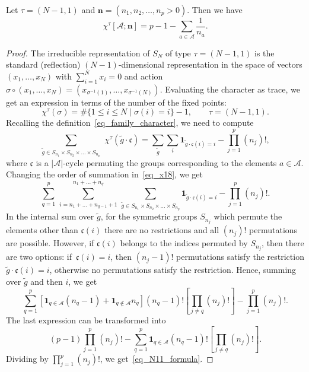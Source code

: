 \begin{theorem}
 \label{Theorem_character_sum_fundamental} Let $\tau=(N-1,1)$ and  $\mathbf n=(n_1, n_2, \dots, n_p>0)$. Then we have
\begin{equation} \label{eq_N11_formula}
 \chi^{\tau}[\mathcal A; \mathbf n]=p-1-\sum_{a\in \mathcal A} \frac{1}{n_a}.
\end{equation}
\end{theorem}
\begin{proof} The irreducible representation of $S_N$ of type $\tau=(N-1,1)$ is the standard (reflection) $(N-1)$-dimensional representation in the space of vectors $(x_1,\dots,x_N)$ with $\sum_{i=1}^N x_i=0$ and action $\sigma\circ (x_1,\dots,x_N)=(x_{\sigma^{-1}(1)},\dots,x_{\sigma^{-1}(N)})$. Evaluating the character as trace, we get an expression in terms of the number of the fixed points:
$$
  \chi^{\tau}(\sigma)=\#\{1\le i \le N\mid \sigma(i)=i\}-1, \qquad \tau=(N-1,1).
$$
Recalling the definition~\eqref{eq_family_character}, we need to compute
\begin{equation}
\label{eq_x18}
\sum_{\tilde g\in S_{n_1}\times S_{n_2}\times  \dots \times S_{n_p}}\,\, \chi^\tau(\tilde g \cdot \mathfrak c)
=\sum_{\tilde g} \sum_i \mathbf 1_{ \tilde g \cdot \mathfrak c (i)=i}  - \prod_{j=1}^p (n_j)!,
\end{equation}
where $\mathfrak c$ is a $|\mathcal A|$-cycle permuting the groups corresponding to the elements $a\in\mathcal A$. Changing the order of summation in~\eqref{eq_x18}, we get
$$
 \sum_{q=1}^p\, \sum_{i=n_1+\dots+n_{q-1}+1}^{n_1+\dots+n_q} \, \sum_{\tilde g\in S_{n_1}\times S_{n_2}\times  \dots \times S_{n_p}} \mathbf 1_{ \tilde g \cdot \mathfrak c (i)=i}  - \prod_{j=1}^p (n_j)!.
$$
In the internal sum over $\tilde g$, for the symmetric groups $S_{n_j}$ which permute the elements other than $ \mathfrak c (i)$ there are no restrictions and all $(n_j)!$ permutations are possible. However, if $\mathfrak c(i)$ belongs to the indices permuted by $S_{n_j}$, then there are two options: if~$\mathfrak c(i)=i$, then $(n_j-1)!$ permutations satisfy the restriction $ \tilde g \cdot \mathfrak c (i)=i$, otherwise no permutations satisfy the restriction. Hence, summing over $\tilde g$ and then $i$, we get
$$\sum_{q=1}^p \left[\mathbf 1_{q\in \mathcal A} (n_q-1)+\mathbf 1_{q\not\in\mathcal A} n_q \right] (n_q-1)! \left[\prod_{j\ne q} (n_j)!\right]
 - \prod_{j=1}^p (n_j)!.
$$
The last expression can be transformed into
$$
(p-1)\prod_{j=1}^p (n_j)! - \sum_{q=1}^p \mathbf 1_{q\in \mathcal A} (n_q-1)! \left[\prod_{j\ne q} (n_j)!\right].
$$
Dividing by $\prod\limits_{j=1}^p (n_j)!$, we get~\eqref{eq_N11_formula}.
\end{proof}



